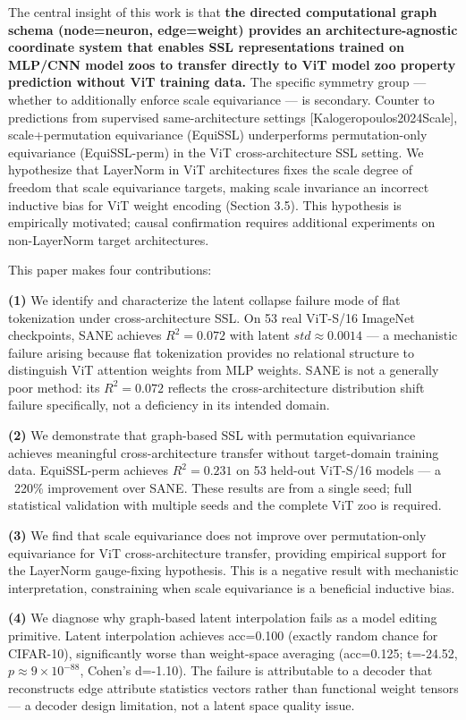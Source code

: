 The central insight of this work is that \textbf{the directed computational graph schema (node=neuron, edge=weight) provides an architecture-agnostic coordinate system that enables SSL representations trained on MLP/CNN model zoos to transfer directly to ViT model zoo property prediction without ViT training data.} The specific symmetry group --- whether to additionally enforce scale equivariance --- is secondary. Counter to predictions from supervised same-architecture settings [Kalogeropoulos2024Scale], scale+permutation equivariance (EquiSSL) underperforms permutation-only equivariance (EquiSSL-perm) in the ViT cross-architecture SSL setting. We hypothesize that LayerNorm in ViT architectures fixes the scale degree of freedom that scale equivariance targets, making scale invariance an incorrect inductive bias for ViT weight encoding (Section 3.5). This hypothesis is empirically motivated; causal confirmation requires additional experiments on non-LayerNorm target architectures.

This paper makes four contributions:

\textbf{(1)} We identify and characterize the latent collapse failure mode of flat tokenization under cross-architecture SSL. On 53 real ViT-S/16 ImageNet checkpoints, SANE achieves $R^{2}=0.072$ with latent $std\approx 0.0014$ --- a mechanistic failure arising because flat tokenization provides no relational structure to distinguish ViT attention weights from MLP weights. SANE is not a generally poor method: its $R^{2}=0.072$ reflects the cross-architecture distribution shift failure specifically, not a deficiency in its intended domain.

\textbf{(2)} We demonstrate that graph-based SSL with permutation equivariance achieves meaningful cross-architecture transfer without target-domain training data. EquiSSL-perm achieves $R^{2}=0.231$ on 53 held-out ViT-S/16 models --- a ~220\% improvement over SANE. These results are from a single seed; full statistical validation with multiple seeds and the complete ViT zoo is required.

\textbf{(3)} We find that scale equivariance does not improve over permutation-only equivariance for ViT cross-architecture transfer, providing empirical support for the LayerNorm gauge-fixing hypothesis. This is a negative result with mechanistic interpretation, constraining when scale equivariance is a beneficial inductive bias.

\textbf{(4)} We diagnose why graph-based latent interpolation fails as a model editing primitive. Latent interpolation achieves acc=0.100 (exactly random chance for CIFAR-10), significantly worse than weight-space averaging (acc=0.125; t=-24.52, $p\approx 9\times 10^{-88}$, Cohen's d=-1.10). The failure is attributable to a decoder that reconstructs edge attribute statistics vectors rather than functional weight tensors --- a decoder design limitation, not a latent space quality issue.

